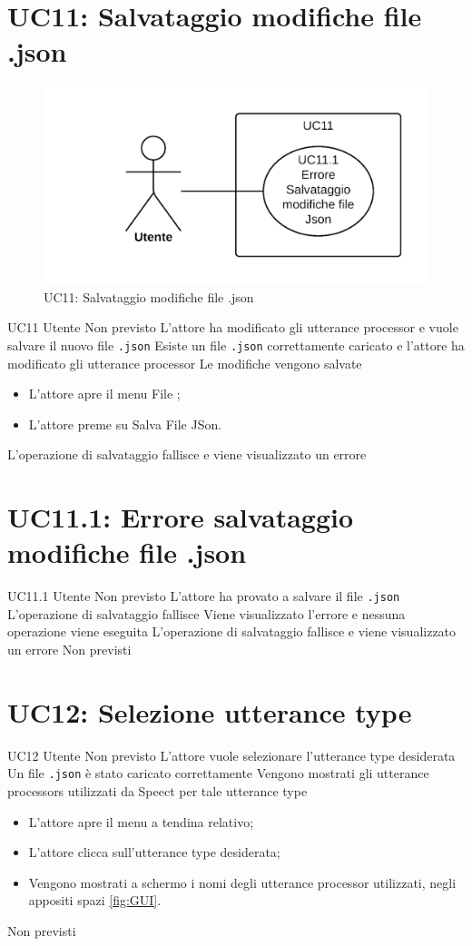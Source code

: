 \documentclass[../AnalisideiRequisiti.tex]{subfiles}
\begin{document}
\section{UC11: Salvataggio modifiche file .json}
\begin{figure}[H]
	\centering
	\includegraphics[width=\textwidth]{../img/UC11.png}
	\caption{UC11: Salvataggio modifiche file .json}
\end{figure}
\UserCase
{UC11}
{Utente}
{Non previsto}
{L'attore ha modificato gli utterance processor e vuole salvare il nuovo file \verb|.json|}
{Esiste un file \verb|.json| correttamente caricato  e l'attore ha modificato gli utterance processor  }
{Le modifiche vengono salvate}
{
	\begin{itemize}
		\item{} L'attore apre il menu File ;
		\item{} L'attore preme su Salva File JSon.
	\end{itemize}
}
{L'operazione di salvataggio fallisce e viene visualizzato un errore }

\section{UC11.1: Errore salvataggio modifiche file .json}
\UserCase
{UC11.1}
{Utente}
{Non previsto}
{L'attore ha provato a salvare il file \verb|.json|}
{L'operazione di salvataggio fallisce}
{Viene visualizzato l'errore e nessuna operazione viene eseguita}
{L'operazione di salvataggio fallisce e viene visualizzato un errore}
{Non previsti}

\section{UC12: Selezione utterance type}
\UserCase
{UC12}
{Utente}
{Non previsto}
{L'attore vuole selezionare l'utterance type desiderata}
{Un file \verb|.json| è stato caricato correttamente }
{Vengono mostrati gli utterance processors utilizzati da Speect per tale utterance type}
{
	\begin{itemize}
		\item{} L'attore apre il menu a tendina relativo;
		\item{} L'attore clicca sull'utterance type desiderata;
		\item{} Vengono mostrati a schermo i nomi degli utterance processor utilizzati, negli appositi spazi \ref{fig:GUI}.
	\end{itemize}
}
{Non previsti}
\end{document}
